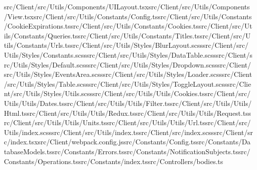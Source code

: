 \documentclass[a4paper,12pt]{article}
\begin{document}
src/Client/src/Utils/Components/UILayout.tsx\newline src/Client/src/Utils/Components/View.tsx\newline src/Client/src/Utils/Constants/Config.ts\newline src/Client/src/Utils/Constants/CookieExpirations.ts\newline src/Client/src/Utils/Constants/Cookies.ts\newline src/Client/src/Utils/Constants/Queries.ts\newline src/Client/src/Utils/Constants/Titles.ts\newline src/Client/src/Utils/Constants/Urls.ts\newline src/Client/src/Utils/Styles/BlurLayout.scss\newline src/Client/src/Utils/Styles/Constants.scss\newline src/Client/src/Utils/Styles/DataTable.scss\newline src/Client/src/Utils/Styles/Default.scss\newline src/Client/src/Utils/Styles/Dropdown.scss\newline src/Client/src/Utils/Styles/EventsArea.scss\newline src/Client/src/Utils/Styles/Loader.scss\newline src/Client/src/Utils/Styles/Table.scss\newline src/Client/src/Utils/Styles/ToggleLayout.scss\newline src/Client/src/Utils/Styles/Utils.scss\newline src/Client/src/Utils/Utils/Cookies.ts\newline src/Client/src/Utils/Utils/Dates.ts\newline src/Client/src/Utils/Utils/Filter.ts\newline src/Client/src/Utils/Utils/Html.ts\newline src/Client/src/Utils/Utils/Redux.ts\newline src/Client/src/Utils/Utils/Request.ts\newline src/Client/src/Utils/Utils/Units.ts\newline src/Client/src/Utils/Utils/Url.ts\newline src/Client/src/Utils/index.scss\newline src/Client/src/Utils/index.ts\newline src/Client/src/index.scss\newline src/Client/src/index.tsx\newline src/Client/webpack.config.js\newline src/Constants/Config.ts\newline src/Constants/DatabaseModels.ts\newline src/Constants/Errors.ts\newline src/Constants/NotificationSubjects.ts\newline src/Constants/Operations.ts\newline src/Constants/index.ts\newline src/Controllers/bodies.ts\newline 
\end{document}
